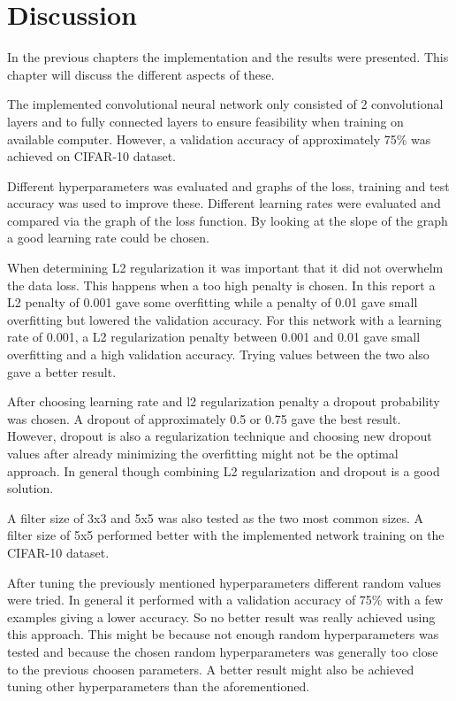 \chapter{Discussion}
\label{chp:disc}

In the previous chapters the implementation and the results were presented. This chapter will discuss the different aspects of these.

The implemented convolutional neural network only consisted of 2 convolutional layers and to fully connected layers to ensure feasibility when training on available computer. However, a validation accuracy of approximately 75\% was achieved on CIFAR-10 dataset.

Different hyperparameters was evaluated and graphs of the loss, training and test accuracy was used to improve these. Different learning rates were evaluated and compared via the graph of the loss function. By looking at the slope of the graph a good learning rate could be chosen.

When determining L2 regularization it was important that it did not overwhelm the data loss. This happens when a too high penalty is chosen. In this report a L2 penalty of 0.001 gave some overfitting while a penalty of 0.01 gave small overfitting but lowered the validation accuracy. For this network with a learning rate of 0.001, a L2 regularization penalty between 0.001 and 0.01 gave small overfitting and a high validation accuracy. Trying values between the two also gave a better result.

After choosing learning rate and l2 regularization penalty a dropout probability was chosen. A dropout of approximately 0.5 or 0.75 gave the best result. However, dropout is also a regularization technique and choosing new dropout values after already minimizing the overfitting might not be the optimal approach. In general though combining L2 regularization and dropout is a good solution. 

A filter size of 3x3 and 5x5 was also tested as the two most common sizes. A filter size of 5x5 performed better with the implemented network training on the CIFAR-10 dataset.

After tuning the previously mentioned hyperparameters different random values were tried. In general it performed with a validation accuracy of 75\% with a few examples giving a lower accuracy. So no better result was really achieved using this approach. This might be because not enough random hyperparameters was tested and because the chosen random hyperparameters was generally too close to the previous choosen parameters. A better result might also be achieved tuning other hyperparameters than the aforementioned.

